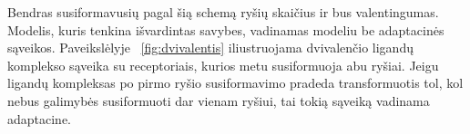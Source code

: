 \documentclass[10pt]{article}
\begin{document}
           
Bendras susiformavusių pagal šią schemą ryšių skaičius  ir bus valentingumas. Modelis, kuris tenkina išvardintas savybes, vadinamas modeliu  be adaptacinės sąveikos. Paveikslėlyje ~\ref{fig:dvivalentis} iliustruojama dvivalenčio ligandų komplekso sąveika su receptoriais, kurios metu susiformuoja  abu ryšiai. Jeigu ligandų kompleksas po pirmo ryšio susiformavimo pradeda transformuotis tol, kol nebus galimybės susiformuoti dar vienam ryšiui, tai tokią sąveiką vadinama  adaptacine.  
          
          



\begin{figure}[h!]
\end{figure}

\begin{figure}[h!]
\end{figure}
\end{document}
